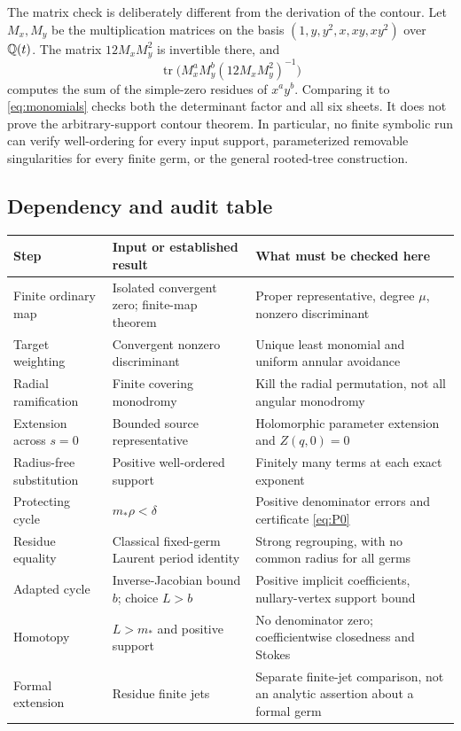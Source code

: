 \documentclass[11pt,letterpaper]{article}
\theoremstyle{definition}
\theoremstyle{remark}
\numberwithin{equation}{section}
\begin{document}
The matrix check is deliberately different from the derivation of the
contour. Let $M_x,M_y$ be the multiplication matrices on the basis
$(1,y,y^2,x,xy,xy^2)$ over $\mathbb Q(t)$. The matrix
$12M_xM_y^2$ is invertible there, and
\[
 \operatorname{tr}\bigl(M_x^aM_y^b(12M_xM_y^2)^{-1}\bigr)
\]
computes the sum of the simple-zero residues of $x^a y^b$. Comparing it to
\eqref{eq:monomials} checks both the determinant factor and all six sheets.
It does not prove the arbitrary-support contour theorem. In particular, no
finite symbolic run can verify well-ordering for every input support,
parameterized removable singularities for every finite germ, or the general
rooted-tree construction.

\subsection{Dependency and audit table}
\begin{center}\small
\begin{longtable}{@{}L{0.25\textwidth}L{0.34\textwidth}L{0.33\textwidth}@{}}
\toprule
Step & Input or established result & What must be checked here\\
\midrule\endhead
Finite ordinary map & Isolated convergent zero; finite-map theorem
 & Proper representative, degree $\mu$, nonzero discriminant\\[0.4em]
Target weighting & Convergent nonzero discriminant
 & Unique least monomial and uniform annular avoidance\\[0.4em]
Radial ramification & Finite covering monodromy
 & Kill the radial permutation, not all angular monodromy\\[0.4em]
Extension across $s=0$ & Bounded source representative
 & Holomorphic parameter extension and $Z(q,0)=0$\\[0.4em]
Radius-free substitution & Positive well-ordered support
 & Finitely many terms at each exact exponent\\[0.4em]
Protecting cycle & $m_*\rho<\delta$
 & Positive denominator errors and certificate \eqref{eq:P0}\\[0.4em]
Residue equality & Classical fixed-germ Laurent period identity
 & Strong regrouping, with no common radius for all germs\\[0.4em]
Adapted cycle & Inverse-Jacobian bound $b$; choice $L>b$
 & Positive implicit coefficients, nullary-vertex support bound\\[0.4em]
Homotopy & $L>m_*$ and positive support
 & No denominator zero; coefficientwise closedness and Stokes\\[0.4em]
Formal extension & Residue finite jets
 & Separate finite-jet comparison, not an analytic assertion about a formal germ\\
\bottomrule
\end{longtable}
\end{center}
\end{document}
